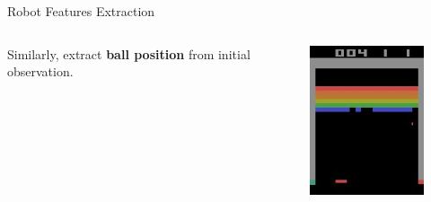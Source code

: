 \begin{frame}{Robot Features Extraction}
    \begin{columns}[c,onlytextwidth]
            Similarly, extract \textbf{ball position} from
            initial observation.
            \begin{figure}
                \includegraphics[width=\textwidth]{images/robotfeaturesextractorsequence/robotfeatures-original-image.jpg}
            \end{figure}
    \end{columns}
\end{frame}

